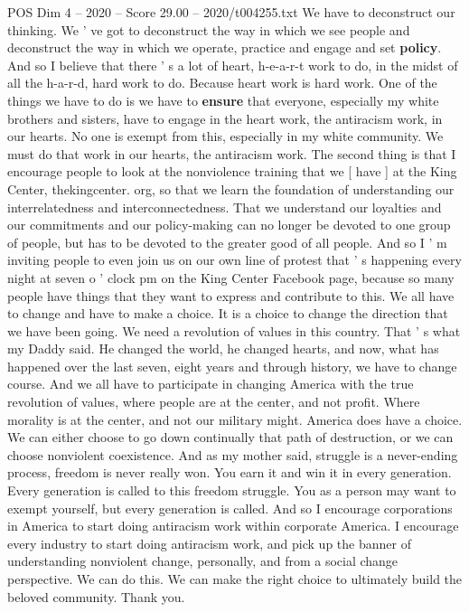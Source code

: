 \begin{textsample}{POS Dim 4 – 2020 – Score 29.00 – 2020/t004255.txt}
We have to deconstruct our thinking.
We ' ve got to deconstruct the way in which we see people and deconstruct the way in which we operate, practice and engage and set \textbf{policy}.
And so I believe that there ' s a lot of heart, h-e-a-r-t work to do, in the midst of all the h-a-r-d, hard work to do.
Because heart work is hard work.
One of the things we have to do is we have to \textbf{ensure} that everyone, especially my white brothers and sisters, have to engage in the heart work, the antiracism work, in our hearts.
No one is exempt from this, especially in my white community.
We must do that work in our hearts, the antiracism work.
The second thing is that I encourage people to look at the nonviolence training that we [ have ] at the King Center, thekingcenter. org, so that we learn the foundation of understanding our interrelatedness and interconnectedness.
That we understand our loyalties and our commitments and our policy-making can no longer be devoted to one group of people, but has to be devoted to the greater good of all people.
And so I ' m inviting people to even join us on our own line of protest that ' s happening every night at seven o ' clock pm on the King Center Facebook page, because so many people have things that they want to express and contribute to this.
We all have to change and have to make a choice.
It is a choice to change the direction that we have been going.
We need a revolution of values in this country.
That ' s what my Daddy said.
He changed the world, he changed hearts, and now, what has happened over the last seven, eight years and through history, we have to change course.
And we all have to participate in changing America with the true revolution of values, where people are at the center, and not profit.
Where morality is at the center, and not our military might.
America does have a choice.
We can either choose to go down continually that path of destruction, or we can choose nonviolent coexistence.
And as my mother said, struggle is a never-ending process, freedom is never really won.
You earn it and win it in every generation.
Every generation is called to this freedom struggle.
You as a person may want to exempt yourself, but every generation is called.
And so I encourage corporations in America to start doing antiracism work within corporate America.
I encourage every industry to start doing antiracism work, and pick up the banner of understanding nonviolent change, personally, and from a social change perspective.
We can do this.
We can make the right choice to ultimately build the beloved community.
Thank you.

\end{textsample}
